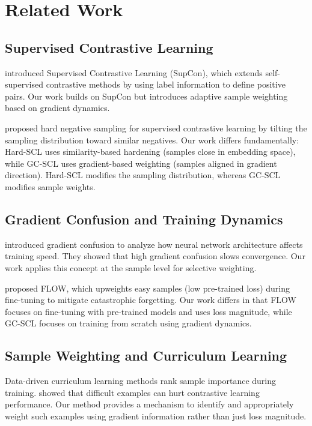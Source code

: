 \documentclass{article}
\begin{document}
\section{Related Work}

\subsection{Supervised Contrastive Learning}

\citet{khosla2020supervised} introduced Supervised Contrastive Learning (SupCon), which extends self-supervised contrastive methods by using label information to define positive pairs. Our work builds on SupCon but introduces adaptive sample weighting based on gradient dynamics.

\citet{jiang2022supervised} proposed hard negative sampling for supervised contrastive learning by tilting the sampling distribution toward similar negatives. Our work differs fundamentally: Hard-SCL uses similarity-based hardening (samples close in embedding space), while GC-SCL uses gradient-based weighting (samples aligned in gradient direction). Hard-SCL modifies the sampling distribution, whereas GC-SCL modifies sample weights.

\subsection{Gradient Confusion and Training Dynamics}

\citet{sankararaman2020impact} introduced gradient confusion to analyze how neural network architecture affects training speed. They showed that high gradient confusion slows convergence. Our work applies this concept at the sample level for selective weighting.

\citet{sanyal2025upweighting} proposed FLOW, which upweights easy samples (low pre-trained loss) during fine-tuning to mitigate catastrophic forgetting. Our work differs in that FLOW focuses on fine-tuning with pre-trained models and uses loss magnitude, while GC-SCL focuses on training from scratch using gradient dynamics.

\subsection{Sample Weighting and Curriculum Learning}

Data-driven curriculum learning methods rank sample importance during training. \citet{zhang2025understanding} showed that difficult examples can hurt contrastive learning performance. Our method provides a mechanism to identify and appropriately weight such examples using gradient information rather than just loss magnitude.
\end{document}
